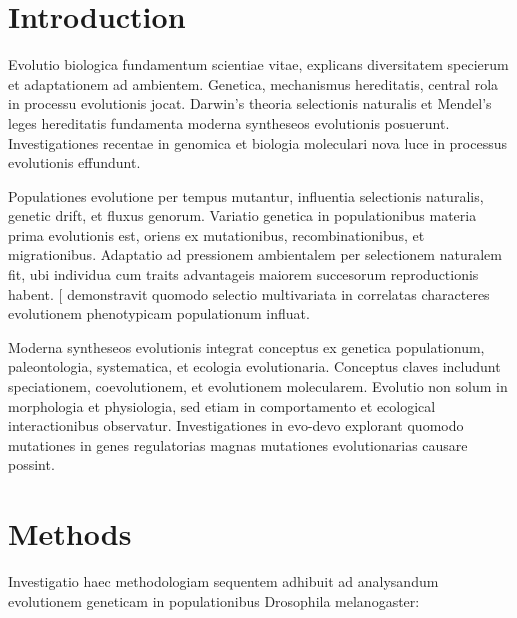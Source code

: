 \documentclass[
]{article}
\begin{document}
\newpage

\section{Introduction}\label{introduction}

\linenumbers
\doublespacing

Evolutio biologica fundamentum scientiae vitae, explicans diversitatem
specierum et adaptationem ad ambientem. Genetica, mechanismus
hereditatis, central rola in processu evolutionis jocat. Darwin's
theoria selectionis naturalis et Mendel's leges hereditatis fundamenta
moderna syntheseos evolutionis posuerunt. Investigationes recentae in
genomica et biologia moleculari nova luce in processus evolutionis
effundunt.

Populationes evolutione per tempus mutantur, influentia selectionis
naturalis, genetic drift, et fluxus genorum. Variatio genetica in
populationibus materia prima evolutionis est, oriens ex mutationibus,
recombinationibus, et migrationibus. Adaptatio ad pressionem ambientalem
per selectionem naturalem fit, ubi individua cum traits advantageis
maiorem succesorum reproductionis habent.
{[}\citeproc{ref-Lande1979-jl}{1}{]} demonstravit quomodo selectio
multivariata in correlatas characteres evolutionem phenotypicam
populationum influat.

Moderna syntheseos evolutionis integrat conceptus ex genetica
populationum, paleontologia, systematica, et ecologia evolutionaria.
Conceptus claves includunt speciationem, coevolutionem, et evolutionem
molecularem. Evolutio non solum in morphologia et physiologia, sed etiam
in comportamento et ecological interactionibus observatur.
Investigationes in evo-devo explorant quomodo mutationes in genes
regulatorias magnas mutationes evolutionarias causare possint.

\section{Methods}\label{methods}

Investigatio haec methodologiam sequentem adhibuit ad analysandum
evolutionem geneticam in populationibus Drosophila melanogaster:
\end{document}
